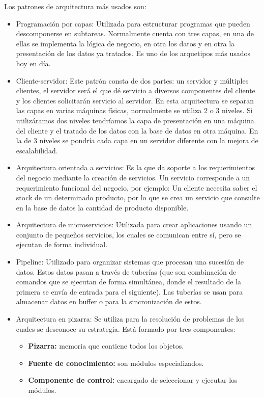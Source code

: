 \documentclass[12pt]{report} %
\begin{document}
 Los patrones de arquitectura más usados son:
 	\begin{itemize}
 	\item Programación por capas: Utilizada para estructurar programas que pueden descomponerse en subtareas. Normalmente cuenta con tres capas, en una de ellas se implementa la lógica de negocio, en otra los datos y en otra la presentación de los datos ya tratados. Es uno de los arquetipos más usados hoy en día.
 	\item Cliente-servidor: Este patrón consta de dos partes: un servidor y múltiples clientes, el servidor será el que dé servicio a diversos componentes del cliente y los clientes solicitarán servicio al servidor. En esta arquitectura se separan las capas en varias máquinas físicas, normalmente se utiliza 2 o 3 niveles. Si utilizáramos dos niveles tendríamos la capa de presentación en una máquina del cliente y el tratado de los datos con la base de datos en otra máquina. En la de 3 niveles se pondría cada capa en un servidor diferente con la mejora de escalabilidad.
 	\item Arquitectura orientada a servicios: Es la que da soporte a los requerimientos del negocio mediante la creación de servicios. Un servicio corresponde a un requerimiento funcional del negocio, por ejemplo: 
 	Un cliente necesita saber el stock de un determinado producto, por lo que se crea un servicio que consulte en la base de datos la cantidad de producto disponible.
 	\item Arquitectura de microservicios: Utilizada para crear aplicaciones usando un conjunto de pequeños servicios, los cuales se comunican entre sí, pero se ejecutan de forma individual.
 	\item Pipeline: Utilizado para organizar sistemas que procesan una sucesión de datos. Estos datos pasan a través de tuberías (que son combinación de comandos que se ejecutan de forma simultánea, donde el resultado de la primera se envía de entrada para el siguiente). Las tuberías se usan para almacenar datos en buffer o para la sincronización de estos.
 	\item Arquitectura en pizarra: Se utiliza para la resolución de problemas de los cuales se desconoce su estrategia. Está formado por tres componentes:
 	\begin{itemize}
 		\item \textbf{Pizarra:} memoria que contiene todos los objetos. 
 		\item \textbf{Fuente de conocimiento:} son módulos especializados. 
 		\item \textbf{Componente de control:} encargado de seleccionar y ejecutar los módulos.

\end{itemize}
\end{itemize}
\end{document}
